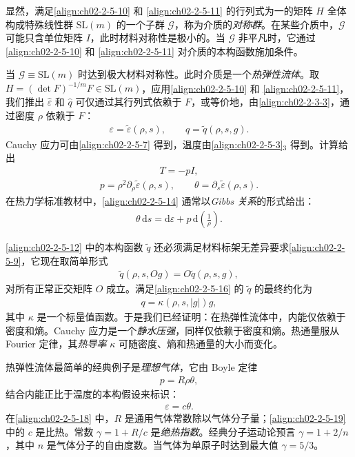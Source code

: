 \documentclass[../../main.tex]{subfiles}
\begin{document}
显然，满足\eqref{align:ch02-2-5-10} 和 \eqref{align:ch02-2-5-11} 的行列式为一的矩阵 $H$ 全体构成特殊线性群 $\mathrm{SL}(m)$ 的一个子群 $\mathscr{G}$，称为介质的\emph{对称群}。在某些介质中，$\mathscr{G}$ 可能只含单位矩阵 $I$，此时材料对称性是极小的。当 $\mathscr{G}$ 非平凡时，它通过\eqref{align:ch02-2-5-10} 和 \eqref{align:ch02-2-5-11} 对介质的本构函数施加条件。

当 $\mathscr{G}\equiv\mathrm{SL}(m)$ 时达到极大材料对称性。此时介质是一个\emph{热弹性流体}。取 $H=(\det F)^{-1/m}F\in\mathrm{SL}(m)$，应用\eqref{align:ch02-2-5-10} 和 \eqref{align:ch02-2-5-11}，我们推出 $\hat{\varepsilon}$ 和 $\hat{q}$ 可仅通过其行列式依赖于 $F$，或等价地，由\eqref{align:ch02-2-3-3}，通过密度 $\rho$ 依赖于 $F$：
\begin{align}
\varepsilon=\tilde{\varepsilon}(\rho,s),\qquad q=\tilde{q}(\rho,s,g).
\label{align:ch02-2-5-12}
\end{align}
Cauchy 应力可由\eqref{align:ch02-2-5-7} 得到，温度由\eqref{align:ch02-2-5-3}$_{3}$ 得到。计算给出
\begin{align}
T=-pI,
\label{align:ch02-2-5-13}
\end{align}
\begin{align}
p=\rho^{2}\partial_{\rho}\tilde{\varepsilon}(\rho,s),\qquad\theta=\partial_{s}\tilde{\varepsilon}(\rho,s).
\label{align:ch02-2-5-14}
\end{align}
在热力学标准教材中，\eqref{align:ch02-2-5-14} 通常以\emph{Gibbs 关系}的形式给出：
\begin{align}
\theta\,\mathrm{d}s=\mathrm{d}\varepsilon+p\,\mathrm{d}\!\left(\frac{1}{\rho}\right).
\label{align:ch02-2-5-15}
\end{align}

\eqref{align:ch02-2-5-12} 中的本构函数 $\tilde{q}$ 还必须满足材料标架无差异要求\eqref{align:ch02-2-5-9}，它现在取简单形式
\begin{align}
\tilde{q}(\rho,s,Og)=O\tilde{q}(\rho,s,g),
\label{align:ch02-2-5-16}
\end{align}
对所有正常正交矩阵 $O$ 成立。满足\eqref{align:ch02-2-5-16} 的 $\tilde{q}$ 的最终约化为
\begin{align}
q=\kappa(\rho,s,|g|)g,
\label{align:ch02-2-5-17}
\end{align}
其中 $\kappa$ 是一个标量值函数。于是我们已经证明：在热弹性流体中，内能仅依赖于密度和熵。Cauchy 应力是一个\emph{静水压强}，同样仅依赖于密度和熵。热通量服从 Fourier 定律，其\emph{热导率} $\kappa$ 可随密度、熵和热通量的大小而变化。

热弹性流体最简单的经典例子是\emph{理想气体}，它由 Boyle 定律
\begin{align}
p=R\rho\theta,
\label{align:ch02-2-5-18}
\end{align}
结合内能正比于温度的本构假设来标识：
\begin{align}
\varepsilon=c\theta.
\label{align:ch02-2-5-19}
\end{align}
在\eqref{align:ch02-2-5-18} 中，$R$ 是通用气体常数除以气体分子量；\eqref{align:ch02-2-5-19} 中的 $c$ 是比热。常数 $\gamma=1+R/c$ 是\emph{绝热指数}。经典分子运动论预言 $\gamma=1+2/n$，其中 $n$ 是气体分子的自由度数。当气体为单原子时达到最大值 $\gamma=5/3$。
\end{document}
